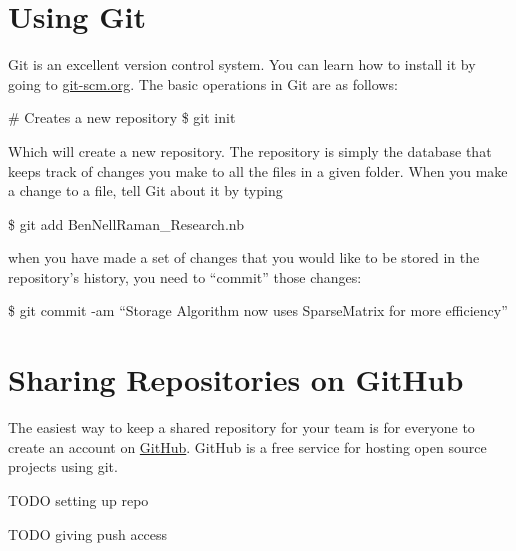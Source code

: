 \section{Using Git}

Git is an excellent version control system. You can learn how to install it by going to \href{http://git-scm.org}{git-scm.org}. The basic operations in Git are as follows:

\begin{code}
	   # Creates a new repository
	   \$ git init
\end{code}
Which will create a new repository. The repository is simply the database that keeps track of changes you make to all the files in a given folder. When you make a change to a file, tell Git about it by typing
\begin{code}
	   \$ git add BenNellRaman_Research.nb
\end{code}
when you have made a set of changes that you would like to be stored in the repository's history, you need to ``commit'' those changes:
\begin{code}
	   \$ git commit -am ``Storage Algorithm now uses SparseMatrix for more efficiency''
\end{code}

\section{Sharing Repositories on GitHub} 

The easiest way to keep a shared repository for your team is for everyone to create an account on \href{http://www.github.com}{GitHub}. GitHub is a free service for hosting open source projects using git. 

TODO setting up repo

TODO giving push access
